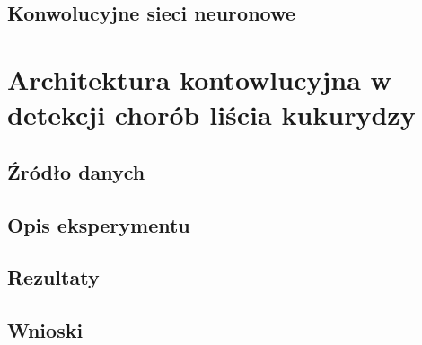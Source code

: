 \documentclass{article}
\begin{document}
\subsection{Konwolucyjne sieci neuronowe}


\section{Architektura kontowlucyjna w detekcji chorób liścia kukurydzy}

\subsection{Źródło danych}

\subsection{Opis eksperymentu}

\subsection{Rezultaty}

\subsection{Wnioski}
\nocite{*}
 
\end{document}
